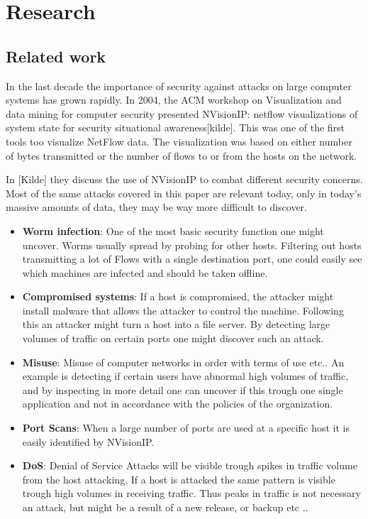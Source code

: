 \chapter{Research}
\label{chp:research} 

\section{Related work}
In the last decade the importance of security against attacks on large computer systems has grown rapidly. In 2004, the ACM workshop on Visualization and data mining for computer security presented NVisionIP: netflow visualizations of system state for security situational awareness[kilde]. This was one of the first tools too visualize NetFlow data. The visualization was based on either number of bytes transmitted or the number of flows to or from the hosts on the network. 

In [Kilde] they discuss the use of NVisionIP to combat different security concerns. Most of the same attacks covered in this paper are relevant today, only in today's massive amounts of data, they may be way more difficult to discover. 

\begin{itemize}
\item \textbf{Worm infection}: One of the most basic security function one might uncover.  Worms usually spread by probing for other hosts. Filtering out hosts transmitting a lot of Flows with a single destination port, one could easily see which machines are infected and should be taken offline. 
\item \textbf{Compromised systems}: If a host is compromised, the attacker might install malware that allows the attacker to control the machine. Following this an attacker might turn a host into a file server. By detecting large volumes of traffic on certain ports one might discover such an attack. 
\item \textbf{Misuse}: Misuse of computer networks in order with terms of use etc.. An example is detecting if certain users have abnormal high volumes of traffic, and by inspecting in more detail one can uncover if this trough one single application and not in accordance with the policies of the organization. 
\item \textbf{Port Scans}: When a large number of ports are used at a specific host it is easily identified by NVisionIP.
\item \textbf{DoS}: Denial of Service Attacks will be visible trough spikes in traffic volume from the host attacking. If a host is attacked the same pattern is visible trough high volumes in receiving traffic. Thus peaks in traffic is not necessary an attack, but might be a result of a new release, or backup etc .. 
\end{itemize}


